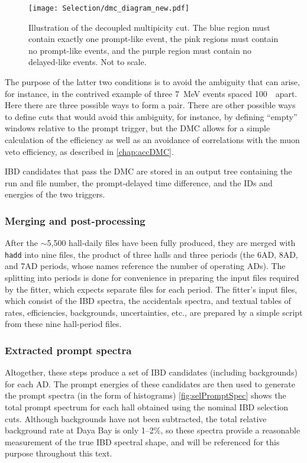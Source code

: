 \documentclass[../thesis.tex]{subfiles}
\begin{document}
\begin{figure}[h]
  \texttt{[image: Selection/dmc\_diagram\_new.pdf]}
  \caption{Illustration of the decoupled multipicity cut. The blue region must contain exactly one prompt-like event, the pink regions must contain no prompt-like events, and the purple region must contain no delayed-like events. Not to scale.}
  \label{fig:dmc_diagram_rM}
\end{figure}

The purpose of the latter two conditions is to avoid the ambiguity that can arise, for instance, in the contrived example of three 7~MeV events spaced 100~\us\ apart. Here there are three possible ways to form a pair. There are other possible ways to define cuts that would avoid this ambiguity, for instance, by defining ``empty'' windows relative to the prompt trigger, but the DMC allows for a simple calculation of the efficiency as well as an avoidance of correlations with the muon veto efficiency, as described in \autoref{chap:accDMC}.

IBD candidates that pass the DMC are stored in an output tree containing the run and file number, the prompt-delayed time difference, and the IDs and energies of the two triggers.

\subsubsection{Merging and post-processing}
\label{sec:selMergingTwo}

After the $\sim$5,500 hall-daily files have been fully produced, they are merged with \texttt{hadd} into nine files, the product of three halls and three periods (the 6AD, 8AD, and 7AD periods, whose names reference the number of operating ADs). The splitting into periods is done for convenience in preparing the input files required by the fitter, which expects separate files for each period. The fitter's input files, which consist of the IBD spectra, the accidentals spectra, and textual tables of rates, efficiencies, backgrounds, uncertainties, etc., are prepared by a simple script from these nine hall-period files.

\subsubsection{Extracted prompt spectra}
\label{sec:selPromptSpec}

Altogether, these steps produce a set of IBD candidates (including backgrounds) for each AD. The prompt energies of these candidates are then used to generate the prompt spectra (in the form of histograms) \autoref{fig:selPromptSpec} shows the total prompt spectrum for each hall obtained using the nominal IBD selection cuts. Although backgrounds have not been subtracted, the total relative background rate at Daya Bay is only 1--2\%, so these spectra provide a reasonable measurement of the true IBD spectral shape, and will be referenced for this purpose throughout this text.
\end{document}
